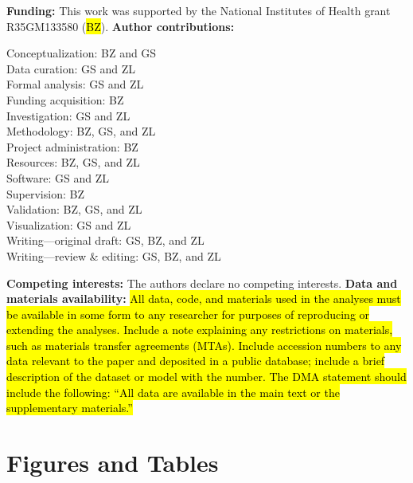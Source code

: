 \documentclass[12pt,letterpaper]{article}
\newcommand{\markblankline}{\newline\mbox{}\newline} %
\begin{document}
\textbf{Funding:} This work was supported by the National Institutes of Health grant R35GM133580 (\hl{BZ}).
\markblankline
\textbf{Author contributions:}\\
\begin{adjustwidth}{.5in}{}
Conceptualization: BZ and GS\\
Data curation: GS and ZL\\
Formal analysis: GS and ZL\\
Funding acquisition: BZ\\
Investigation: GS and ZL\\
Methodology: BZ, GS, and ZL\\
Project administration: BZ\\
Resources: BZ, GS, and ZL\\
Software: GS and ZL\\
Supervision: BZ\\
Validation: BZ, GS, and ZL\\
Visualization: GS and ZL\\
Writing—original draft: GS, BZ, and ZL\\
Writing—review \& editing: GS, BZ, and ZL\\
\end{adjustwidth}
\mbox{}\newline
\vspace{-.5em}
\textbf{Competing interests:} The authors declare no competing interests.
\markblankline
\textbf{Data and materials availability:} \hl{All data, code, and materials used in the analyses must be available in some form to any researcher for purposes of reproducing or extending the analyses. Include a note explaining any restrictions on materials, such as materials transfer agreements (MTAs). Include accession numbers to any data relevant to the paper and deposited in a public database; include a brief description of the dataset or model with the number.  The DMA statement should include the following: “All data are available in the main text or the supplementary materials.”}

\section*{Figures and Tables}
\end{document}
